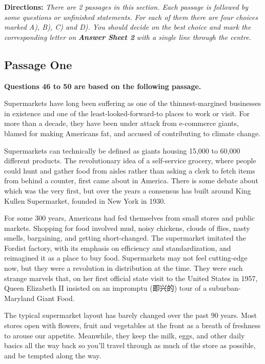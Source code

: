 \documentclass[UTF8,11pt]{ctexart}
\begin{document}
\textbf{Directions: }\textit{There are 2 passages in this section. Each passage is followed by some questions or unfinished} \textit{statements. For each of them there are four choices marked A), B), C) and D). You should decide on the best} \textit{choice and mark the corresponding letter on }\textbf{\textit{Answer Sheet 2}}\textit{ with a single line through the centre.}


\subsection*{\textbf{Passage One}}


\textbf{Questions 46 to 50 are based on the following passage.}


Supermarkets have long been suffering as one of the thinnest-margined businesses in existence and one of the least-looked-forward-to places to work or visit. For more than a decade, they have been under attack from e-commerce giants, blamed for making Americans fat, and accused of contributing to climate change.


Supermarkets can technically be defined as giants housing 15,000 to 60,000 different products. The revolutionary idea of a self-service grocery, where people could hunt and gather food from aisles rather than asking a clerk to fetch items from behind a counter, first came about in America. There is some debate about which was the very first, but over the years a consensus has built around King Kullen Supermarket, founded in New York in 1930.


For some 300 years, Americans had fed themselves from small stores and public markets. Shopping for food involved mud, noisy chickens, clouds of flies, nasty smells, bargaining, and getting short-changed. The supermarket imitated the Fordist factory, with its emphasis on efficiency and standardization, and reimagined it as a place to buy food. Supermarkets may not feel cutting-edge now, but they were a revolution in distribution at the time. They were such strange marvels that, on her first official state visit to the United States in 1957, Queen Elizabeth II insisted on an impromptu (即兴的) tour of a suburban-Maryland Giant Food.


The typical supermarket layout has barely changed over the past 90 years. Most stores open with flowers, fruit and vegetables at the front as a breath of freshness to arouse our appetite. Meanwhile, they keep the milk, eggs, and other daily basics all the way back so you’ll travel through as much of the store as possible, and be tempted along the way.
\end{document}
